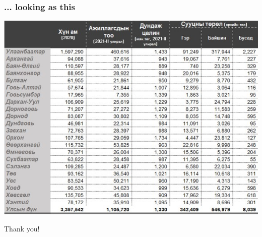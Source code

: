 \documentclass{beamer}
\begin{document}
\begin{frame}
    \frametitle{... looking as this}
    \begin{table}
        \centering
        \includegraphics[scale = 0.75]{figures/project1.jpg}  
    \end{table}
\end{frame}

\begin{frame}
\Huge{\centerline{Thank you!}}
\end{frame}

\end{document}
